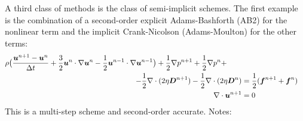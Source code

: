 A third class of methods is the class of semi-implicit schemes. The first example is the combination of a second-order
explicit Adams-Bashforth (AB2) for the nonlinear term and the implicit Crank-Nicolson (Adams-Moulton) for the other terms:
\begin{align}
 \rho \big( \frac{\boldsymbol{u}^{n+1}-\boldsymbol{u}^n}{\Delta t} +
     \frac32\boldsymbol{u}^n \cdot \nabla \boldsymbol{u}^{n} -
     \frac12\boldsymbol{u}^{n-1} \cdot \nabla \boldsymbol{u}^{n-1} \big) 
      + \frac12\nabla p^{n+1} 
      + \frac12\nabla p^{n} +  \qquad\notag\\
         - \frac12\nabla \cdot ( 2 \eta \boldsymbol{D}^{n+1})  
         - \frac12\nabla \cdot ( 2 \eta \boldsymbol{D}^{n}) &=\frac12(\boldsymbol{f}^{n+1}+\boldsymbol{f}^n)\\
\nabla \cdot \boldsymbol{u}^{n+1} &= 0
\label{eq:NS_AB2}
\end{align}
This is a multi-step scheme and second-order accurate.
Notes:

